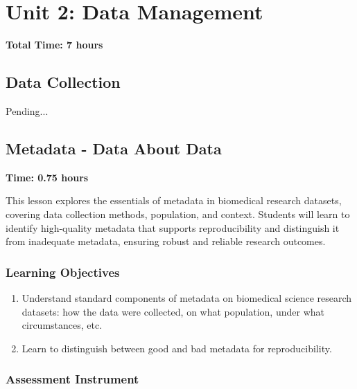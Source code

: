 \chapter{Unit 2: Data Management}
\label{chap:unit2}

\textbf{Total Time: 7 hours}


\section{Data Collection}
\label{sec:DataCollection}

Pending... 

\section{Metadata - Data About Data}
\label{sec:2.2}

\textbf{Time: 0.75 hours}

This lesson explores the essentials of metadata in biomedical research datasets, covering data collection methods, population, and context. Students will learn to identify high-quality metadata that supports reproducibility and distinguish it from inadequate metadata, ensuring robust and reliable research outcomes.

\subsection{Learning Objectives}

\begin{enumerate}
    \item Understand standard components of metadata on biomedical science research datasets: how the data were collected, on what population, under what circumstances, etc.
    \item Learn to distinguish between good and bad metadata for reproducibility.
\end{enumerate}

\subsection{Assessment Instrument}

